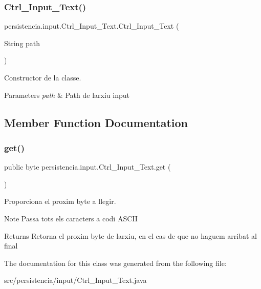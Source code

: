 \subsubsection{\texorpdfstring{Ctrl\+\_\+\+Input\+\_\+\+Text()}{Ctrl\_Input\_Text()}}
{\footnotesize\ttfamily persistencia.\+input.\+Ctrl\+\_\+\+Input\+\_\+\+Text.\+Ctrl\+\_\+\+Input\+\_\+\+Text (\begin{DoxyParamCaption}\item[{String}]{path }\end{DoxyParamCaption})\hspace{0.3cm}{\ttfamily [inline]}}



Constructor de la classe. 


\begin{DoxyParams}{Parameters}
{\em path} & Path de l\textquotesingle{}arxiu input \\
\hline
\end{DoxyParams}


\subsection{Member Function Documentation}
\mbox{\label{classpersistencia_1_1input_1_1Ctrl__Input__Text_a8b501ae723f8c6f8d63305a56e9720c3}} 
\subsubsection{\texorpdfstring{get()}{get()}}
{\footnotesize\ttfamily public byte persistencia.\+input.\+Ctrl\+\_\+\+Input\+\_\+\+Text.\+get (\begin{DoxyParamCaption}{ }\end{DoxyParamCaption})\hspace{0.3cm}{\ttfamily [inline]}}



Proporciona el proxim byte a llegir. 

\begin{DoxyNote}{Note}
Passa tots els caracters a codi A\+S\+C\+II 
\end{DoxyNote}
\begin{DoxyReturn}{Returns}
Retorna el proxim byte de l\textquotesingle{}arxiu, en el cas de que no haguem arribat al final 
\end{DoxyReturn}


The documentation for this class was generated from the following file\+:\begin{DoxyCompactItemize}
\item 
src/persistencia/input/Ctrl\+\_\+\+Input\+\_\+\+Text.\+java\end{DoxyCompactItemize}
